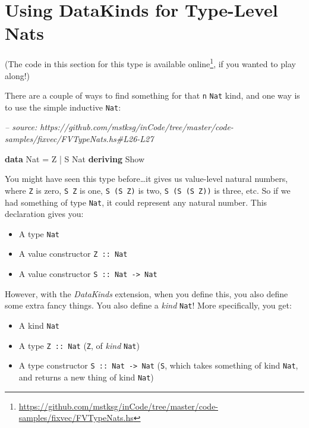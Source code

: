\documentclass[]{article}
\newenvironment{Shaded}{}{}
\newcommand{\CommentTok}[1]{\textcolor[rgb]{0.38,0.63,0.69}{\textit{#1}}}
\newcommand{\DataTypeTok}[1]{\textcolor[rgb]{0.56,0.13,0.00}{#1}}
\newcommand{\FunctionTok}[1]{\textcolor[rgb]{0.02,0.16,0.49}{#1}}
\newcommand{\KeywordTok}[1]{\textcolor[rgb]{0.00,0.44,0.13}{\textbf{#1}}}
\renewcommand{\href}[2]{#2\footnote{\url{#1}}}
\begin{document}
\hypertarget{using-datakinds-for-type-level-nats}{%
\section{Using DataKinds for Type-Level
Nats}\label{using-datakinds-for-type-level-nats}}

(The code in this section for this type is
\href{https://github.com/mstksg/inCode/tree/master/code-samples/fixvec/FVTypeNats.hs}{available
online}, if you wanted to play along!)

There are a couple of ways to find something for that \texttt{n} \texttt{Nat}
kind, and one way is to use the simple inductive \texttt{Nat}:

\begin{Shaded}
\begin{Highlighting}[]
\CommentTok{-- source: https://github.com/mstksg/inCode/tree/master/code-samples/fixvec/FVTypeNats.hs#L26-L27}

\KeywordTok{data} \DataTypeTok{Nat} \FunctionTok{=} \DataTypeTok{Z} \FunctionTok{|} \DataTypeTok{S} \DataTypeTok{Nat}
         \KeywordTok{deriving} \DataTypeTok{Show}
\end{Highlighting}
\end{Shaded}

You might have seen this type before\ldots{}it gives us value-level natural
numbers, where \texttt{Z} is zero, \texttt{S\ Z} is one, \texttt{S\ (S\ Z)} is
two, \texttt{S\ (S\ (S\ Z))} is three, etc. So if we had something of type
\texttt{Nat}, it could represent any natural number. This declaration gives you:

\begin{itemize}
\tightlist
\item
  A type \texttt{Nat}
\item
  A value constructor \texttt{Z\ ::\ Nat}
\item
  A value constructor \texttt{S\ ::\ Nat\ -\textgreater{}\ Nat}
\end{itemize}

However, with the \emph{DataKinds} extension, when you define this, you also
define some extra fancy things. You also define a \emph{kind} \texttt{Nat}! More
specifically, you get:

\begin{itemize}
\tightlist
\item
  A kind \texttt{Nat}
\item
  A type \texttt{Z\ ::\ Nat} (\texttt{Z}, of \emph{kind} \texttt{Nat})
\item
  A type constructor \texttt{S\ ::\ Nat\ -\textgreater{}\ Nat} (\texttt{S},
  which takes something of kind \texttt{Nat}, and returns a new thing of kind
  \texttt{Nat})
\end{itemize}
\end{document}
